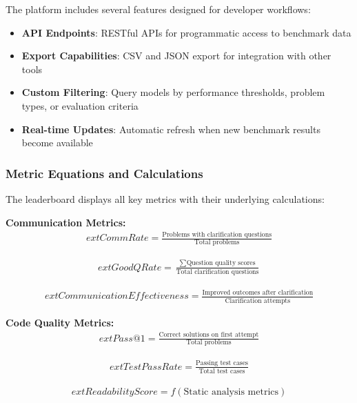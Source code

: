 \documentclass[conference]{IEEEtran}
\begin{document}
The platform includes several features designed for developer workflows:

\begin{itemize}
    \item \textbf{API Endpoints}: RESTful APIs for programmatic access to benchmark data
    \item \textbf{Export Capabilities}: CSV and JSON export for integration with other tools
    \item \textbf{Custom Filtering}: Query models by performance thresholds, problem types, or evaluation criteria
    \item \textbf{Real-time Updates}: Automatic refresh when new benchmark results become available
\end{itemize}

\subsubsection{Metric Equations and Calculations}

The leaderboard displays all key metrics with their underlying calculations:

\textbf{Communication Metrics:}
\begin{align}
        ext{Comm Rate} = \frac{\text{Problems with clarification questions}}{\text{Total problems}}
\end{align}

\begin{align}
        ext{Good Q Rate} = \frac{\sum \text{Question quality scores}}{\text{Total clarification questions}}
\end{align}

\begin{align}
        ext{Communication Effectiveness} = \frac{\text{Improved outcomes after clarification}}{\text{Clarification attempts}}
\end{align}

\textbf{Code Quality Metrics:}
\begin{align}
        ext{Pass@1} = \frac{\text{Correct solutions on first attempt}}{\text{Total problems}}
\end{align}

\begin{align}
        ext{Test Pass Rate} = \frac{\text{Passing test cases}}{\text{Total test cases}}
\end{align}

\begin{align}
        ext{Readability Score} = f(\text{Static analysis metrics})
\end{align}
\end{document}

